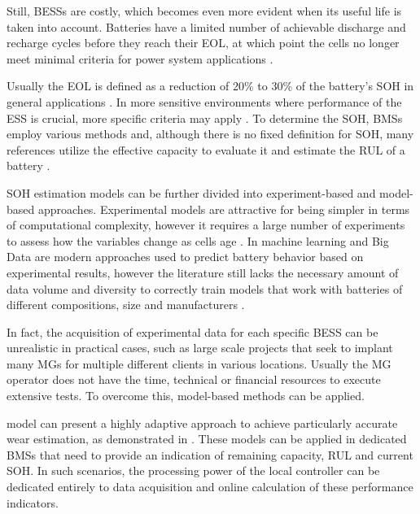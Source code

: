 \documentclass{ieeeaccess}
\begin{document}
    Still, \acp{BESS} are costly, which becomes even more evident when its useful life is taken into account. Batteries have a limited number of achievable discharge and recharge cycles before they reach their \ac{EOL}, at which point the cells no longer meet minimal criteria for power system applications \cite{ZHU2021100537, hart2014modeling}.

    Usually the \ac{EOL} is defined as a reduction of 20\% to 30\% of the battery's \ac{SOH} in general applications \cite{ECKER2014, NARAYAN2018}. In more sensitive environments where performance of the \ac{ESS} is crucial, more specific criteria may apply \cite{WOOD20115147, JACOB2020101565}. To determine the \ac{SOH}, \acp{BMS} employ various methods and, although there is no fixed definition for \ac{SOH}, many references utilize the effective capacity to evaluate it and estimate the \ac{RUL} of a battery \cite{TIAN2020120813, rezvanizaniani2014review, BIOLOGIC2021, bose2002battery}.

    \ac{SOH} estimation models can be further divided into experiment-based and model-based approaches. Experimental models are attractive for being simpler in terms of computational complexity, however it requires a large number of experiments to assess how the variables change as cells age \cite{XIONG2018264}. In \cite{li2019lithium, kang2014new} machine learning and Big Data are modern approaches used to predict battery behavior based on experimental results, however the literature still lacks the necessary amount of data volume and diversity to correctly train models that work with batteries of different compositions, size and manufacturers \cite{maheshwari2020optimizing}.

    In fact, the acquisition of experimental data for each specific \ac{BESS} can be unrealistic in practical cases, such as large scale projects that seek to implant many \acp{MG} for multiple different clients in various locations. Usually the \ac{MG} operator does not have the time, technical or financial resources to execute extensive tests. To overcome this, model-based methods can be applied.

     model can present a highly adaptive approach to achieve particularly accurate wear estimation, as demonstrated in \cite{XIONG2018264}. These models can be applied in dedicated \acp{BMS} that need to provide an indication of remaining capacity, \ac{RUL} and current \ac{SOH}. In such scenarios, the processing power of the local controller can be dedicated entirely to data acquisition and online calculation of these performance indicators.
\end{document}
